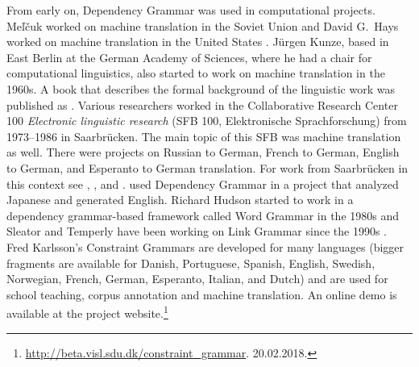From early on, Dependency Grammar was used in computational projects. Meľčuk worked on machine
translation in the Soviet Union \citep{Melcuk64a-u} and David G.\ Hays worked on machine translation
in the United States \citep{HZ60a-u}. Jürgen Kunze, based in East Berlin at the German Academy of
Sciences, where he had a chair for computational linguistics, also started to work on machine
translation in the 1960s. A book that describes the formal background of the linguistic work was
published as .  Various researchers worked in the Collaborative Research Center
100 \emph{Electronic linguistic research} (SFB 100, Elektronische Sprachforschung) from 1973--1986
in Saarbrücken. The main topic of this SFB was machine translation as well. There were projects on
Russian to German, French to German, English to German, and
Esperanto to German translation. For work from Saarbrücken in
this context see , , and .
\citet{MIF85a} used Dependency Grammar in a project that analyzed Japanese and
generated English.
Richard Hudson started to work in a dependency grammar-based framework called Word Grammar\indexwg
in the 1980s \citep{Hudson84a-u,Hudson2007a-u} and Sleator and Temperly have been working on Link
Grammar since the 1990s \citep{ST91a-u,GLS95a-u}.
Fred Karlsson's Constraint Grammars \citeyearpar{Karlsson90a-u} are developed for many languages (bigger fragments are available
for Danish, Portuguese, Spanish, English, Swedish, Norwegian, French, German, Esperanto, Italian, and
Dutch) and are used for school teaching,
corpus annotation and machine translation. An online
demo is available at the project website.\footnote{
  \url{http://beta.visl.sdu.dk/constraint_grammar}. 20.02.2018.
}






%

